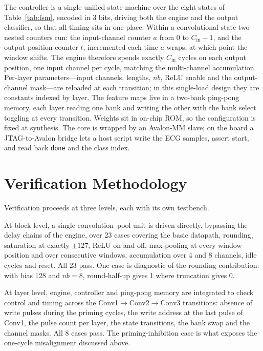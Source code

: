 \documentclass[conference,10pt]{IEEEtran}
\begin{document}
The controller is a single unified state machine over the eight states of
Table~\ref{tab:fsm}, encoded in 3 bits, driving both the engine and the output
classifier, so that all timing sits in one place. Within a convolutional
state two nested counters run: the input-channel counter $a$ from 0 to
$C_{\text{in}}-1$, and the output-position counter $t$, incremented each time $a$
wraps, at which point the window shifts. The engine therefore spends exactly
$C_{\text{in}}$ cycles on each output position, one input channel per cycle,
matching the multi-channel accumulation. Per-layer parameters---input channels,
lengths, $nb$, ReLU enable and the output-channel mask---are reloaded at each
transition; in this single-load design they are constants indexed by layer. The
feature maps live in a two-bank ping-pong memory, each layer reading one bank and
writing the other with the bank select toggling at every transition. Weights sit
in on-chip ROM, so the configuration is fixed at synthesis. The core is wrapped
by an Avalon-MM slave; on the board a JTAG-to-Avalon bridge lets a host script
write the ECG samples, assert start, and read back \texttt{done} and the class
index.

\section{Verification Methodology}
\label{sec:verif}

Verification proceeds at three levels, each with its own testbench.

At block level, a single convolution--pool unit is driven directly, bypassing the
delay chains of the engine, over 23 cases covering the basic datapath, rounding,
saturation at exactly $\pm127$, ReLU on and off, max-pooling at every window
position and over consecutive windows, accumulation over 4 and 8 channels, idle
cycles and reset. All 23 pass. One case is diagnostic of the rounding
contribution: with bias 128 and $nb=8$, round-half-up gives 1 where truncation
gives 0.

At layer level, engine, controller and ping-pong memory are integrated to check
control and timing across the Conv1$\rightarrow$Conv2$\rightarrow$Conv3
transitions: absence of write pulses during the priming cycles, the write address
at the last pulse of Conv1, the pulse count per layer, the state transitions, the
bank swap and the channel masks. All 8 cases pass. The priming-inhibition case is
what exposes the one-cycle misalignment discussed above.
\end{document}
